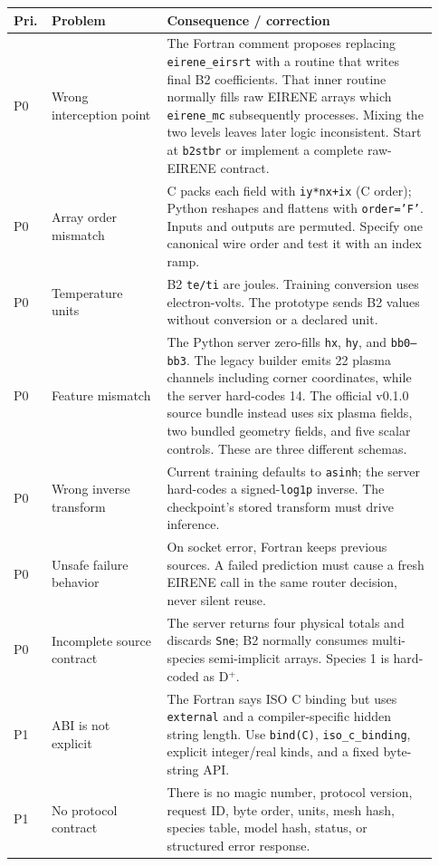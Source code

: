 \documentclass[11pt]{article}
\begin{document}
\begin{longtable}{@{}p{0.06\linewidth}p{0.26\linewidth}p{0.61\linewidth}@{}}
\toprule
Pri. & Problem & Consequence / correction \\
\midrule
\endhead
P0 & Wrong interception point & The Fortran comment proposes replacing \texttt{eirene\_eirsrt} with a routine that writes final B2 coefficients. That inner routine normally fills raw EIRENE arrays which \texttt{eirene\_mc} subsequently processes. Mixing the two levels leaves later logic inconsistent. Start at \texttt{b2stbr} or implement a complete raw-EIRENE contract. \\
P0 & Array order mismatch & C packs each field with \texttt{iy*nx+ix} (C order); Python reshapes and flattens with \texttt{order='F'}. Inputs and outputs are permuted. Specify one canonical wire order and test it with an index ramp. \\
P0 & Temperature units & B2 \texttt{te/ti} are joules. Training conversion uses electron-volts. The prototype sends B2 values without conversion or a declared unit. \\
P0 & Feature mismatch & The Python server zero-fills \texttt{hx}, \texttt{hy}, and \texttt{bb0--bb3}. The legacy builder emits 22 plasma channels including corner coordinates, while the server hard-codes 14. The official v0.1.0 source bundle instead uses six plasma fields, two bundled geometry fields, and five scalar controls. These are three different schemas. \\
P0 & Wrong inverse transform & Current training defaults to \texttt{asinh}; the server hard-codes a signed-\texttt{log1p} inverse. The checkpoint's stored transform must drive inference. \\
P0 & Unsafe failure behavior & On socket error, Fortran keeps previous sources. A failed prediction must cause a fresh EIRENE call in the same router decision, never silent reuse. \\
P0 & Incomplete source contract & The server returns four physical totals and discards \texttt{Sne}; B2 normally consumes multi-species semi-implicit arrays. Species 1 is hard-coded as D$^+$. \\
P1 & ABI is not explicit & The Fortran says ISO C binding but uses \texttt{external} and a compiler-specific hidden string length. Use \texttt{bind(C)}, \texttt{iso\_c\_binding}, explicit integer/real kinds, and a fixed byte-string API. \\
P1 & No protocol contract & There is no magic number, protocol version, request ID, byte order, units, mesh hash, species table, model hash, status, or structured error response. \\

\end{longtable}
\end{document}
